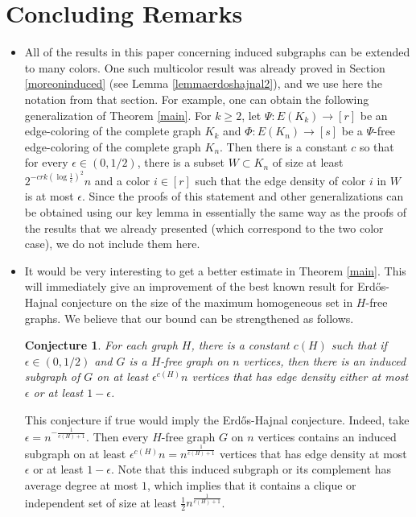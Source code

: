 \documentclass[11pt]{article}
\newtheorem{conjecture}[theorem]{Conjecture}
\begin{document}
\section{Concluding Remarks}
\begin{itemize}
\item
All of the results in this paper concerning induced subgraphs can be extended to
many colors. One such multicolor result
was already proved in Section \ref{moreoninduced} (see Lemma \ref{lemmaerdoshajnal2}),
and we use here the notation from that section. For example, one can obtain the following
generalization of Theorem \ref{main}. For $k \geq 2$, let $\Psi:E(K_{k}) \rightarrow [r]$ be
an edge-coloring of the complete graph $K_{k}$ and $\Phi:E(K_n) \rightarrow [s]$ be
a $\Psi$-free edge-coloring of the complete graph $K_n$. Then there is a constant $c$ so that for
every $\epsilon \in (0,1/2)$,  there is a subset $W \subset K_n$ of size at least $2^{-crk (\log
\frac{1}{\epsilon})^2}n$ and a color $i \in [r]$ such that the edge
density of color $i$ in $W$ is at most $\epsilon$.
Since the proofs of this statement and other generalizations can be obtained using our key lemma in essentially the same way as
the proofs of the results that we already presented (which correspond to the two color case), we
do not include them here.

\item
It would be very interesting to get a better estimate in Theorem \ref{main}. This will immediately
give an improvement of the best known result for Erd\H{o}s-Hajnal conjecture on the size of the maximum
homogeneous set in $H$-free graphs. We believe that our bound can be strengthened as follows.

\begin{conjecture}\label{mainconjecture}
For each graph $H$, there is a constant $c(H)$ such that if
$\epsilon \in (0,1/2)$ and $G$ is a $H$-free graph on $n$ vertices,
then there is an induced subgraph of $G$ on at least
$\epsilon^{c(H)}n$ vertices that has edge density either at most
$\epsilon$ or at least $1-\epsilon$.
\end{conjecture}

\noindent
This conjecture if true would imply the Erd\H{o}s-Hajnal
conjecture. Indeed, take $\epsilon=n^{-\frac{1}{c(H)+1}}$. Then
every $H$-free graph $G$ on $n$ vertices contains an induced
subgraph on at least $\epsilon^{c(H)}n=n^{\frac{1}{c(H)+1}}$
vertices that has edge density at most $\epsilon$ or at least
$1-\epsilon$. Note that this induced subgraph or its
complement has average degree at most $1$, which implies that it
contains a clique or independent set of size at least
$\frac{1}{2}n^{\frac{1}{c(H)+1}}$.


\end{itemize}
\end{document}
